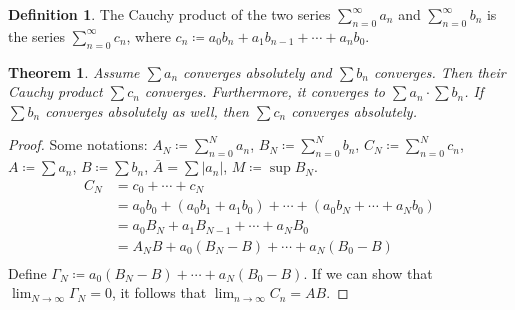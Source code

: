 \documentclass[12pt]{article}
\theoremstyle{plain}
\newtheorem{thm}{Theorem}
\theoremstyle{definition}
\newtheorem*{defn}{Definition}
\begin{document}
\begin{defn}
    The Cauchy product of the two series $\sum_{n=0}^\infty a_n$ and $\sum_{n=0}^\infty b_n$ is the
    series $\sum_{n=0}^\infty c_n$, where $c_n\coloneqq a_0b_n+a_1b_{n-1}+\cdots + a_nb_0$.
\end{defn}

\begin{thm}
    Assume $\sum a_n$ converges absolutely and $\sum b_n$ converges.
    Then their Cauchy product $\sum c_n$ converges.
    Furthermore, it converges to $\sum a_n \cdot \sum b_n$.
    If $\sum b_n$ converges absolutely as well, then $\sum c_n$ converges absolutely.
\end{thm}
\begin{proof}
    Some notations:
    $A_N\coloneqq \sum_{n=0}^N a_n$, $B_N\coloneqq \sum_{n=0}^N b_n$, $C_N\coloneqq \sum_{n=0}^N
    c_n$, $A\coloneqq \sum a_n$, $B\coloneqq \sum b_n$, $\bar{A}=\sum |a_n|$, $M\coloneqq \sup B_N$. 
    $$\begin{aligned}
        C_N&=c_0+\cdots + c_N\\
        &= a_0b_0 + (a_0b_1+a_1b_0) + \cdots + (a_0b_N+\cdots + a_Nb_0)\\
        &= a_0B_N + a_1B_{N-1} + \cdots + a_NB_0\\
        &= A_N B + a_0(B_N-B) + \cdots + a_N(B_0-B)\\
    \end{aligned}$$
    Define $\Gamma_N\coloneqq a_0(B_N-B) + \cdots + a_N(B_0-B)$.
    If we can show that $\lim_{N\rightarrow\infty}\Gamma_N=0$, it follows that $\lim_{n\rightarrow\infty}
    C_n = AB$.


\end{proof}
\end{document}

